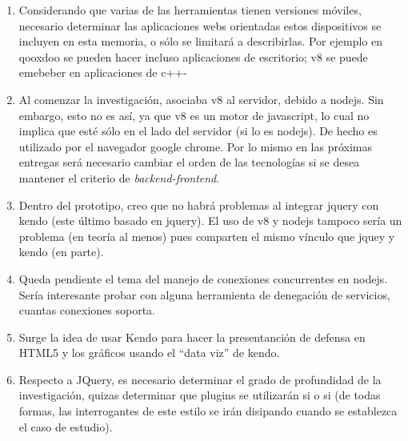 \begin{enumerate}
 \item Considerando que varias de las herramientas tienen versiones móviles, necesario determinar las aplicaciones webs orientadas 
 estos dispositivos se incluyen en esta memoria, o sólo se limitará a describirlas. Por ejemplo en qooxdoo se pueden hacer incluso
 aplicaciones de escritorio; v8 se puede emebeber en aplicaciones de c++-
 \item Al comenzar la investigación, asociaba v8 al servidor, debido a nodejs. Sin embargo, esto no es así, ya que v8 es un motor
 de javascript, lo cual no implica que esté sólo en el lado del servidor (si lo es nodejs). De hecho es utilizado por el navegador
 google chrome. Por lo mismo en las próximas entregas será necesario cambiar el orden de las tecnologías si se desea mantener 
 el criterio de \textit{backend-frontend}.
 \item Dentro del prototipo, creo que no habrá problemas al integrar jquery con kendo (este último basado en jquery). El uso
 de v8 y nodejs tampoco sería un problema (en teoría al menos) pues comparten el mismo vínculo que jquey y kendo (en parte).
 \item Queda pendiente el tema del manejo de conexiones concurrentes en nodejs. Sería interesante probar con alguna herramienta de 
 denegación de servicios, cuantas conexiones soporta.
 \item Surge la idea de usar Kendo para hacer la presentanción de defensa en HTML5 y los gráficos usando el ``data viz''
 de kendo.
 \item Respecto a JQuery, es necesario determinar el grado de profundidad de la investigación, quizas determinar que plugins 
 se utilizarán si o si (de todas formas, las interrogantes de este estilo se irán disipando cuando se establezca el caso de estudio).
\end{enumerate}


